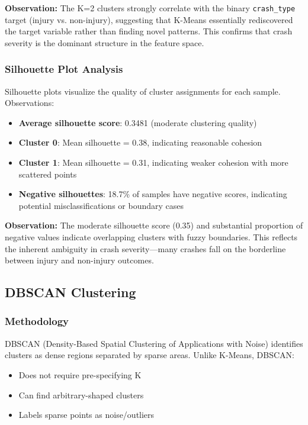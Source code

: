 \documentclass[12pt,man]{apa7}
\begin{document}
\textbf{Observation:} The K=2 clusters strongly correlate with the binary \texttt{crash\_type} target (injury vs. non-injury), suggesting that K-Means essentially rediscovered the target variable rather than finding novel patterns. This confirms that crash severity is the dominant structure in the feature space.

\subsubsection{Silhouette Plot Analysis}

Silhouette plots visualize the quality of cluster assignments for each sample. Observations:

\begin{itemize}
    \item \textbf{Average silhouette score}: 0.3481 (moderate clustering quality)
    \item \textbf{Cluster 0}: Mean silhouette = 0.38, indicating reasonable cohesion
    \item \textbf{Cluster 1}: Mean silhouette = 0.31, indicating weaker cohesion with more scattered points
    \item \textbf{Negative silhouettes}: 18.7\% of samples have negative scores, indicating potential misclassifications or boundary cases
\end{itemize}

\textbf{Observation:} The moderate silhouette score (0.35) and substantial proportion of negative values indicate overlapping clusters with fuzzy boundaries. This reflects the inherent ambiguity in crash severity—many crashes fall on the borderline between injury and non-injury outcomes.

\subsection{DBSCAN Clustering}

\subsubsection{Methodology}

DBSCAN (Density-Based Spatial Clustering of Applications with Noise) identifies clusters as dense regions separated by sparse areas. Unlike K-Means, DBSCAN:
\begin{itemize}
    \item Does not require pre-specifying K
    \item Can find arbitrary-shaped clusters
    \item Labels sparse points as noise/outliers
\end{itemize}
\end{document}
